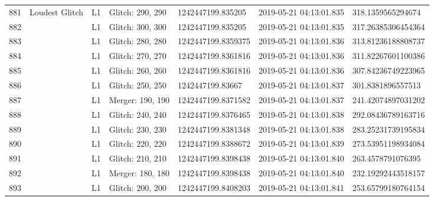 \begin{longtable}{lllllll}
881  &                                     Loudest Glitch &       L1 &  Glitch: 290, 290 &   1242447199.835205 &  2019-05-21 04:13:01.835 &   318.1359565294674 \\
882  &                                                    &       L1 &  Glitch: 300, 300 &   1242447199.835205 &  2019-05-21 04:13:01.835 &  317.26385306454364 \\
883  &                                                    &       L1 &  Glitch: 280, 280 &  1242447199.8359375 &  2019-05-21 04:13:01.836 &  313.81236188808737 \\
884  &                                                    &       L1 &  Glitch: 270, 270 &  1242447199.8361816 &  2019-05-21 04:13:01.836 &  311.82267601100386 \\
885  &                                                    &       L1 &  Glitch: 260, 260 &  1242447199.8361816 &  2019-05-21 04:13:01.836 &  307.84236749223965 \\
886  &                                                    &       L1 &  Glitch: 250, 250 &    1242447199.83667 &  2019-05-21 04:13:01.837 &   301.8381896557513 \\
887  &                                                    &       L1 &  Merger: 190, 190 &  1242447199.8371582 &  2019-05-21 04:13:01.837 &  241.42074897031202 \\
888  &                                                    &       L1 &  Glitch: 240, 240 &  1242447199.8376465 &  2019-05-21 04:13:01.838 &  292.08436789163716 \\
889  &                                                    &       L1 &  Glitch: 230, 230 &  1242447199.8381348 &  2019-05-21 04:13:01.838 &  283.25231739195834 \\
890  &                                                    &       L1 &  Glitch: 220, 220 &  1242447199.8388672 &  2019-05-21 04:13:01.839 &  273.53951198934084 \\
891  &                                                    &       L1 &  Glitch: 210, 210 &  1242447199.8398438 &  2019-05-21 04:13:01.840 &   263.4578791076395 \\
892  &                                                    &       L1 &  Merger: 180, 180 &  1242447199.8398438 &  2019-05-21 04:13:01.840 &  232.19292443518157 \\
893  &                                                    &       L1 &  Glitch: 200, 200 &  1242447199.8408203 &  2019-05-21 04:13:01.841 &  253.65799180764154 \\

\end{longtable}
